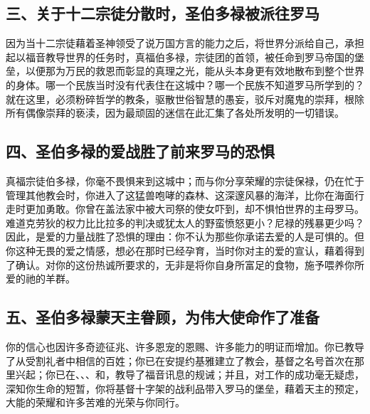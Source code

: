 
\subsection{三、关于十二宗徒分散时，圣伯多禄被派往罗马}

因为当十二宗徒藉着圣神领受了说万国方言的能力之后，将世界分派给自己，承担起以福音教导世界的任务时，真福伯多禄，宗徒团的首领，被任命到罗马帝国的堡垒，以便那为万民的救恩而彰显的真理之光，能从头本身更有效地散布到整个世界的身体。哪一个民族当时没有代表住在这城中？哪一个民族不知道罗马所学到的？就在这里，必须粉碎哲学的教条，驱散世俗智慧的愚妄，驳斥对魔鬼的崇拜，根除所有偶像崇拜的亵渎，因为最顽固的迷信在此汇集了各处所发明的一切错误。\par


\subsection{四、圣伯多禄的爱战胜了前来罗马的恐惧}

真福宗徒伯多禄，你毫不畏惧来到这城中；而与你分享荣耀的宗徒保禄，仍在忙于管理其他教会时，你进入了这猛兽咆哮的森林、这深邃风暴的海洋，比你在海面行走时更加勇敢。你曾在盖法家中被大司祭的使女吓到，却不惧怕世界的主母罗马。难道克劳狄的权力比比拉多的判决或犹太人的野蛮愤怒更小？尼禄的残暴更少吗？因此，是爱的力量战胜了恐惧的理由：你不认为那些你承诺去爱的人是可惧的。但你这种无畏的爱之情感，想必在那时已经孕育，当时你对主的爱的宣认，藉着得到了确认。对你的这份热诚所要求的，无非是将你自身所富足的食物，施予喂养你所爱的祂的羊群。\par


\subsection{五、圣伯多禄蒙天主眷顾，为伟大使命作了准备}

你的信心也因许多奇迹征兆、许多恩宠的恩赐、许多能力的明证而增加。你已教导了从受割礼者中相信的百姓；你已在安提约基雅建立了教会，基督之名号首次在那里兴起；你已在、、、和，教导了福音讯息的规诫；并且，对工作的成功毫无疑虑，深知你生命的短暂，你将基督十字架的战利品带入罗马的堡垒，藉着天主的预定，大能的荣耀和许多苦难的光荣与你同行。\par

